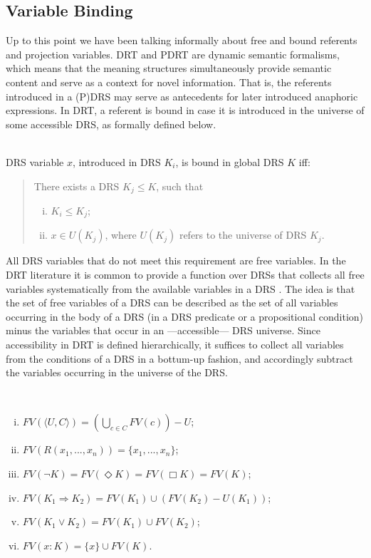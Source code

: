 \subsection{Variable Binding}

Up to this point we have been talking informally about free and bound
referents and projection variables. DRT and PDRT are dynamic semantic
formalisms, which means that the meaning structures simultaneously provide
semantic content and serve as a context for novel information. That is, the
referents introduced in a (P)DRS may serve as antecedents for later
introduced anaphoric expressions. In DRT, a referent is bound in case it is
introduced in the universe of some accessible DRS, as formally defined below.

\begin{definition}~\\
DRS variable $x$, introduced in DRS $K_i$, is bound in global DRS $K$ iff:
\begin{quote}
There exists a DRS $K_j \leq K$, such that
\begin{enumerate}[i.]
  \item $K_i \leq K_j$;
  \item $x\in U(K_j)$, where $U(K_j)$ refers to the universe of DRS $K_j$.
\end{enumerate}
\end{quote}
\end{definition}

\noindent All DRS variables that do not meet this requirement are free
variables. In the DRT literature it is common to provide a function over
DRSs that collects all free variables systematically from the available
variables in a DRS
. The idea is that the set of free variables of a DRS can be described
as the set of all variables occurring in the body of a DRS (in a DRS
predicate or a propositional condition) minus the variables that occur in an
---accessible--- DRS universe. Since accessibility in DRT is defined
hierarchically, it suffices to collect all variables from the conditions of
a DRS in a bottum-up fashion, and accordingly subtract the variables
occurring in the universe of the DRS.

\begin{definition}~\label{def:fdrsvs} 
  \begin{enumerate}[i.]
    \item $FV(\langle U, C \rangle) = (\bigcup_{c\in C} FV(c)) - U$;
    \item $FV(R(x_1,...,x_n)) = \{x_1,...,x_n\}$;
    \item $FV(\neg K) = FV(\Diamond K) = FV(\Box K) = FV(K)$;
    \item $FV(K_1 \Rightarrow K_2) = FV(K_1) \cup (FV(K_2) - U(K_1))$;
    \item $FV(K_1 \vee K_2) = FV(K_1) \cup FV(K_2)$;
    \item $FV(x:K) = \{x\} \cup FV(K)$.
  \end{enumerate}
\end{definition}

